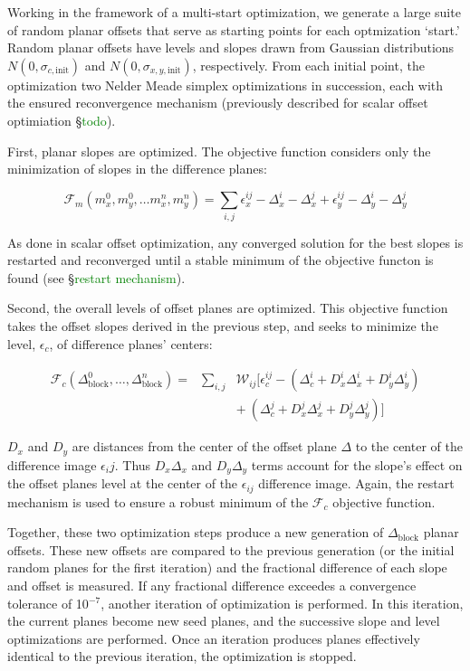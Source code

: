 \documentclass[iop]{emulateapj}
\newcommand{\todo}[1]{\textcolor{green}{#1}}
\begin{document}
Working in the framework of a multi-start optimization, we generate a large suite of random planar offsets that serve as starting points for each optmization `start.' Random planar offsets have levels and slopes drawn from Gaussian distributions $N(0, \sigma_{c,\mathrm{init}})$ and $N(0, \sigma_{x,y,\mathrm{init}})$, respectively. From each initial point, the optimization two Nelder Meade simplex optimizations in succession, each with the ensured reconvergence mechanism (previously described for scalar offset optimiation \S \todo{todo}).

First, planar slopes are optimized. The objective function considers only the minimization of slopes in the difference planes:

\begin{equation}
	\mathcal{F}_m(m_x^0,m_y^0,\ldots m_x^n, m_y^n) = \sum_{i,j} \epsilon_x^{ij} - \Delta_x^i - \Delta_x^j + \epsilon_y^{ij} - \Delta_y^i - \Delta_y^j
\end{equation}

\noindent As done in scalar offset optimization, any converged solution for the best slopes is restarted and reconverged until a stable minimum of the objective functon is found (see \S \todo{restart mechanism}).

Second, the overall levels of offset planes are optimized. This objective function takes the offset slopes derived in the previous step, and seeks to minimize the level, $\epsilon_c$, of difference planes' centers:

\begin{eqnarray}\nonumber
	\mathcal{F}_c(\Delta_\mathrm{block}^0,\ldots,\Delta_\mathrm{block}^n) = &\sum_{i,j}& \mathcal{W}_{ij} [ \epsilon^{ij}_c - (\Delta_c^i + D_x^i\Delta_x^i + D_y^i\Delta_y^i) \\
	&& +~(\Delta_c^j + D_x^j\Delta_x^j + D_y^j\Delta_y^j) ]
\end{eqnarray}

$D_x$ and $D_y$ are distances from the center of the offset plane $\Delta$ to the center of the difference image $\epsilon_ij$. Thus $D_x\Delta_x$ and $D_y\Delta_y$ terms account for the slope's effect on the offset planes level at the center of the $\epsilon_{ij}$ difference image. Again, the restart mechanism is used to ensure a robust minimum of the $\mathcal{F}_c$ objective function.

Together, these two optimization steps produce a new generation of $\Delta_\mathrm{block}$ planar offsets. These new offsets are compared to the previous generation (or the initial random planes for the first iteration) and the fractional difference of each slope and offset is measured. If any fractional difference exceedes a convergence tolerance of 10$^{-7}$, another iteration of optimization is performed. In this iteration, the current planes become new seed planes, and the successive slope and level optimizations are performed. Once an iteration produces planes effectively identical to the previous iteration, the optimization is stopped.
\end{document}
